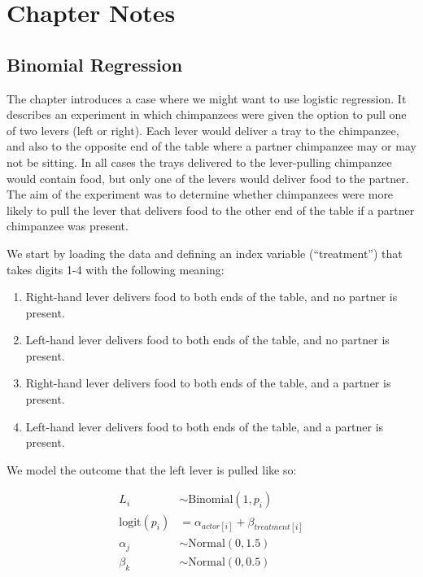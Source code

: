 \documentclass[
]{book}
\providecommand{\tightlist}{%
  \setlength{\itemsep}{0pt}\setlength{\parskip}{0pt}}
\begin{document}
\hypertarget{chapter-notes-10}{%
\section{Chapter Notes}\label{chapter-notes-10}}

\hypertarget{binomial-regression}{%
\subsection*{Binomial Regression}\label{binomial-regression}}

The chapter introduces a case where we might want to use logistic regression. It describes an experiment in which chimpanzees were given the option to pull one of two levers (left or right). Each lever would deliver a tray to the chimpanzee, and also to the opposite end of the table where a partner chimpanzee may or may not be sitting. In all cases the trays delivered to the lever-pulling chimpanzee would contain food, but only one of the levers would deliver food to the partner. The aim of the experiment was to determine whether chimpanzees were more likely to pull the lever that delivers food to the other end of the table if a partner chimpanzee was present.

We start by loading the data and defining an index variable (``treatment'') that takes digits 1-4 with the following meaning:

\begin{enumerate}
\def\labelenumi{\arabic{enumi}.}
\tightlist
\item
  Right-hand lever delivers food to both ends of the table, and no partner is present.
\item
  Left-hand lever delivers food to both ends of the table, and no partner is present.
\item
  Right-hand lever delivers food to both ends of the table, and a partner is present.
\item
  Left-hand lever delivers food to both ends of the table, and a partner is present.
\end{enumerate}

We model the outcome that the left lever is pulled like so:

\[
\begin{aligned}
L_i &\sim \text{Binomial}(1,p_i) \\
\text{logit}(p_i) &= \alpha_{actor[i]} + \beta_{treatment[i]} \\
\alpha_j &\sim \text{Normal}(0,1.5) \\
\beta_k &\sim \text{Normal}(0,0.5)
\end{aligned}
\]
\end{document}
